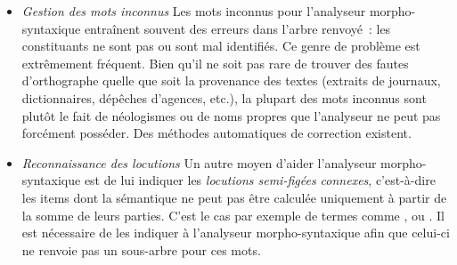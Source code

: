 \begin{itemize}

\item \textit{Gestion des mots inconnus} Les mots inconnus pour
l'analyseur morpho-syntaxique entraînent souvent des erreurs dans
l'arbre renvoyé~: les constituants ne sont pas ou sont mal identifiés.
Ce genre de problème est extrêmement fréquent. Bien qu'il ne soit pas
rare de trouver des fautes d'orthographe quelle que soit la provenance
des textes (extraits de journaux, dictionnaires, dépêches d'agences,
etc.), la plupart des mots inconnus sont plutôt le fait de néologismes
ou de noms propres que l'analyseur ne peut pas forcément posséder. %
Des méthodes automatiques de correction existent. 

  
\item \textit{Reconnaissance des locutions} Un autre moyen d'aider
l'analyseur morpho-syntaxique est de lui indiquer les \emph{locutions
  semi-figées connexes}, c'est-à-dire les items dont la sémantique ne
peut pas être calculée uniquement à partir de la somme de leurs
parties.  C'est le cas par exemple de termes comme ,  ou . Il
est nécessaire de les indiquer à l'analyseur morpho-syntaxique afin
que celui-ci ne renvoie pas un sous-arbre pour ces mots.

\end{itemize}

